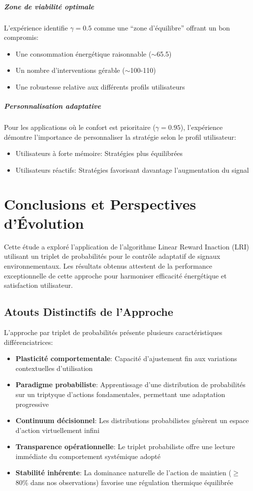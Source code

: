 \documentclass[a4paper,11pt]{article}
\begin{document}
\subparagraph{Zone de viabilité optimale}
L'expérience identifie $\gamma=0.5$ comme une ``zone d'équilibre'' offrant un bon compromis:
\begin{itemize}
    \item Une consommation énergétique raisonnable ($\sim$65.5)
    \item Un nombre d'interventions gérable ($\sim$100-110)
    \item Une robustesse relative aux différents profils utilisateurs
\end{itemize}

\subparagraph{Personnalisation adaptative}
Pour les applications où le confort est prioritaire ($\gamma=0.95$), l'expérience démontre l'importance de personnaliser la stratégie selon le profil utilisateur:
\begin{itemize}
    \item Utilisateurs à forte mémoire: Stratégies plus équilibrées
    \item Utilisateurs réactifs: Stratégies favorisant davantage l'augmentation du signal
\end{itemize}


\section{Conclusions et Perspectives d'Évolution}

Cette étude a exploré l'application de l'algorithme Linear Reward Inaction (LRI) utilisant un triplet de probabilités pour le contrôle adaptatif de signaux environnementaux. Les résultats obtenus attestent de la performance exceptionnelle de cette approche pour harmoniser efficacité énergétique et satisfaction utilisateur.

\subsection{Atouts Distinctifs de l'Approche}

L'approche par triplet de probabilités présente plusieurs caractéristiques différenciatrices:

\begin{itemize}
    \item \textbf{Plasticité comportementale}: Capacité d'ajustement fin aux variations contextuelles d'utilisation
    \item \textbf{Paradigme probabiliste}: Apprentissage d'une distribution de probabilités sur un triptyque d'actions fondamentales, permettant une adaptation progressive
    \item \textbf{Continuum décisionnel}: Les distributions probabilistes génèrent un espace d'action virtuellement infini
    \item \textbf{Transparence opérationnelle}: Le triplet probabiliste offre une lecture immédiate du comportement systémique adopté
    \item \textbf{Stabilité inhérente}: La dominance naturelle de l'action de maintien ($\geq$80\% dans nos observations) favorise une régulation thermique équilibrée
\end{itemize}
\end{document}
